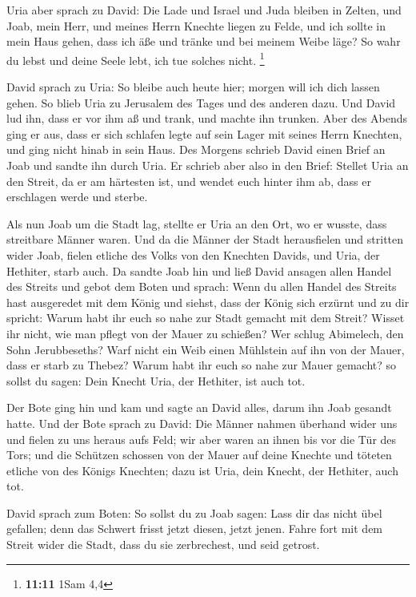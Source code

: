  Uria aber sprach zu David: Die Lade und Israel und Juda
bleiben in Zelten, und Joab, mein Herr, und meines Herrn Knechte liegen
zu Felde, und ich sollte in mein Haus gehen, dass ich äße und tränke und
bei meinem Weibe läge? So wahr du lebst und deine Seele lebt, ich tue
solches nicht. \footnote{\textbf{11:11} 1Sam 4,4}

 David sprach zu Uria: So bleibe auch heute hier; morgen
will ich dich lassen gehen. So blieb Uria zu Jerusalem des Tages und des
anderen dazu.  Und David lud ihn, dass er vor ihm aß und
trank, und machte ihn trunken. Aber des Abends ging er aus, dass er sich
schlafen legte auf sein Lager mit seines Herrn Knechten, und ging nicht
hinab in sein Haus.  Des Morgens schrieb David einen
Brief an Joab und sandte ihn durch Uria.  Er schrieb aber
also in den Brief: Stellet Uria an den Streit, da er am härtesten ist,
und wendet euch hinter ihm ab, dass er erschlagen werde und sterbe.

 Als nun Joab um die Stadt lag, stellte er Uria an den
Ort, wo er wusste, dass streitbare Männer waren.  Und da
die Männer der Stadt herausfielen und stritten wider Joab, fielen
etliche des Volks von den Knechten Davids, und Uria, der Hethiter, starb
auch.  Da sandte Joab hin und ließ David ansagen allen
Handel des Streits  und gebot dem Boten und sprach: Wenn
du allen Handel des Streits hast ausgeredet mit dem König
 und siehst, dass der König sich erzürnt und zu dir
spricht: Warum habt ihr euch so nahe zur Stadt gemacht mit dem Streit?
Wisset ihr nicht, wie man pflegt von der Mauer zu schießen?
 Wer schlug Abimelech, den Sohn Jerubbeseths? Warf nicht
ein Weib einen Mühlstein auf ihn von der Mauer, dass er starb zu Thebez?
Warum habt ihr euch so nahe zur Mauer gemacht? so sollst du sagen: Dein
Knecht Uria, der Hethiter, ist auch tot.

 Der Bote ging hin und kam und sagte an David alles,
darum ihn Joab gesandt hatte.  Und der Bote sprach zu
David: Die Männer nahmen überhand wider uns und fielen zu uns heraus
aufs Feld; wir aber waren an ihnen bis vor die Tür des Tors;
 und die Schützen schossen von der Mauer auf deine
Knechte und töteten etliche von des Königs Knechten; dazu ist Uria, dein
Knecht, der Hethiter, auch tot.

 David sprach zum Boten: So sollst du zu Joab sagen: Lass
dir das nicht übel gefallen; denn das Schwert frisst jetzt diesen, jetzt
jenen. Fahre fort mit dem Streit wider die Stadt, dass du sie
zerbrechest, und seid getrost.

